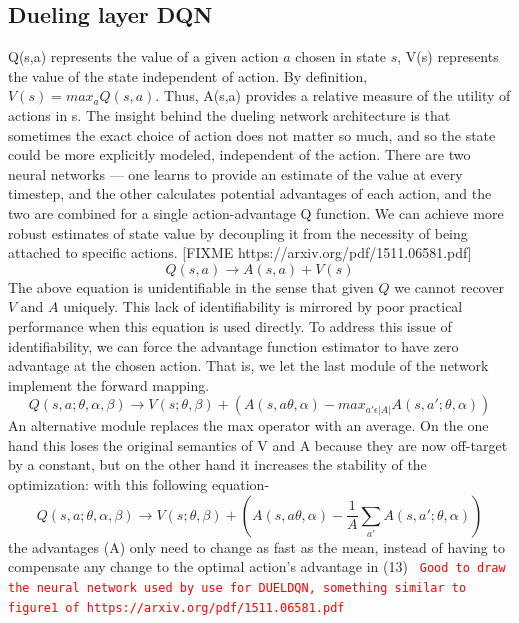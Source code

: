 \subsection{Dueling layer DQN}
Q(s,a) represents the value of a given action $a$ chosen in state $s$, V(s) represents the value of the state independent of action. By definition, $V(s)=max_{a}Q(s,a)$. Thus, A(s,a) provides a relative measure of the utility of actions in s. The insight behind the dueling network architecture is that sometimes the exact choice of action does not matter so much, and so the state could be more explicitly modeled, independent of the action. There are two neural networks — one learns to provide an estimate of the value at every timestep, and the other calculates potential advantages of each action, and the two are combined for a single action-advantage Q function. We can achieve more robust estimates of state value by decoupling it from the necessity of being attached to specific actions.
 [FIXME https://arxiv.org/pdf/1511.06581.pdf]
\newline
\begin{equation}
Q(s,a) \rightarrow A(s,a) + V(s)
\end{equation}
The above equation is unidentifiable in the sense that given $Q$
we cannot recover $V$ and $A$ uniquely. This lack of identifiability is mirrored by poor practical performance when this equation is used directly. To address this issue of identifiability, we can force the advantage
function estimator to have zero advantage at the
chosen action. That is, we let the last module of the network
implement the forward mapping.
\begin{equation}
Q(s,a; \theta, \alpha, \beta) \rightarrow V(s; \theta, \beta) + (A(s,a\theta, \alpha) - max_{a' \epsilon |A|} A(s,a';\theta,\alpha ))
\end{equation}
An alternative module replaces the max operator with an
average. On the one hand this loses the original semantics of V and
A because they are now off-target by a constant, but on
the other hand it increases the stability of the optimization:
with this following equation-
\begin{equation}
Q(s,a; \theta, \alpha, \beta) \rightarrow V(s; \theta, \beta) + (A(s,a\theta, \alpha) - \frac{1}{A} \sum_{a'}^{} A(s,a';\theta,\alpha ))
\end{equation}
 the advantages (A) only need to change as fast as the
mean, instead of having to compensate any change to the
optimal action’s advantage in  (13)
\newline
 \textcolor{red}{\texttt{ Good to draw the neural network used by use for DUELDQN, something similar to figure1 of https://arxiv.org/pdf/1511.06581.pdf }}
